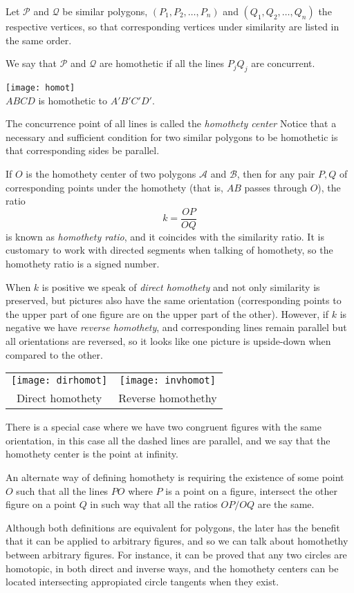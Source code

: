 \documentclass[12pt]{article}
\begin{document}
Let $\mathcal{P}$ and $\mathcal{Q}$ be similar polygons, $(P_1,P_2,\ldots,P_n)$ and $(Q_1,Q_2,\ldots,Q_n)$ the respective vertices, so that corresponding vertices under similarity are listed in the same order.

We say that $\mathcal{P}$ and $\mathcal{Q}$ are homothetic if all the lines $P_jQ_j$ are concurrent.
\begin{center}
\texttt{[image: homot]}\\
$ABCD$ is homothetic to $A'B'C'D'$.
\end{center}
The concurrence point of all lines is called the \emph{homothety center}
Notice that a necessary and sufficient condition for two similar polygons to be homothetic is that corresponding sides be parallel.

If $O$ is the homothety center of two polygons $\mathcal{A}$ and $\mathcal{B}$, then for any pair $P, Q$  of corresponding points under  the homothety (that is, $AB$ passes through $O$), the ratio 
\[
k=\frac{OP}{OQ}
\]
is known as \emph{homothety ratio}, and it coincides with the similarity ratio. It is customary to work with directed segments when talking of homothety, so the  homothety ratio is a signed number. 

When $k$ is positive we speak of \emph{direct homothety} and not only similarity is preserved, but pictures also have the same orientation (corresponding points to the upper part of one figure are on the upper part of the other). 
However, if $k$ is negative we have \emph{reverse homothety}, and corresponding lines remain parallel but all orientations are reversed, so it looks like one picture is upside-down when compared to the other. 
\begin{center}
\begin{tabular}{cc}
\texttt{[image: dirhomot]} & 
\texttt{[image: invhomot]} \\
Direct homothety & Reverse homothethy
\end{tabular}
\end{center}
There is a special case where we have two congruent figures with the same orientation, in this case all the dashed lines are parallel, and we say that the homothety center is the point at infinity.


An alternate way of defining homothety is requiring the existence of some point $O$ such that all the lines $PO$ where $P$ is a point on a figure, intersect the other figure on a point $Q$ in such way that all the ratios $OP/OQ$ are the same.

Although both definitions are equivalent for polygons, the later has the benefit that it can be applied to arbitrary figures, and so we can talk about homothethy between arbitrary figures. For instance, it can be proved that any two circles are homotopic, in both direct and inverse ways, and the homothety centers can be  located intersecting appropiated circle tangents when they exist.
\end{document}
